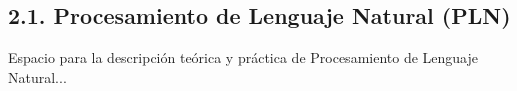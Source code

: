 \subsection{2.1. Procesamiento de Lenguaje Natural (PLN)}\label{sec:pln}

Espacio para la descripción teórica y práctica de Procesamiento de Lenguaje Natural...
